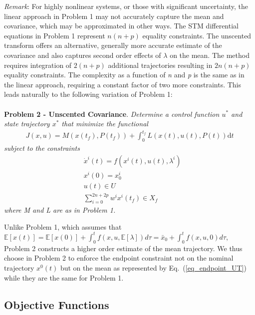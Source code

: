\documentclass[10pt,a4paper]{article}
\begin{document}
	\textit{Remark}: For highly nonlinear systems, or those with significant uncertainty, the linear approach in Problem 1 may not accurately capture the mean and covariance, which may be approximated in other ways. The STM differential equations in Problem 1 represent $n(n+p)$ equality constraints. The unscented transform \cite{UT,UKF1} offers an alternative, generally more accurate estimate of the covariance and also captures second order effects of $\lambda$ on the mean. The method requires integration of $2(n+p)$ additional trajectories resulting in $2n(n+p)$ equality constraints. The complexity as a function of \textit{n} and \textit{p} is the same as in the linear approach, requiring a constant factor of two more constraints. This leads naturally to the following variation of Problem 1:
	\\\\
	\textbf{Problem 2 - Unscented Covariance}. \textit{Determine a control function $ u^* $ and state trajectory $ x^* $ that minimize the functional}
		\begin{align}
		J(x,u) = M(x(t_f),P(t_f)) + \int_{0}^{t_f}L(x(t),u(t),P(t))\mathrm{d}t
		\end{align}
		\textit{	subject to the constraints }
		\begin{align}
		&\dot{x}^i(t) = f(x^i(t),u(t),\lambda^i) \\
		&x^i(0) = x^i_0 \\
		&u(t) \in U \\
		&\sum_{i=0}^{2n+2p}w^ix^i(t_f) \in X_f \label{eq_endpoint_UT}
		\end{align}
	\textit{where M and L are as in Problem 1.}
		
	Unlike Problem 1, which assumes that $\mathbb{E}[x(t)] = \mathbb{E}[x(0)] + \int_{0}^{t} f(x,u,\mathbb{E}[\lambda]) d\tau = \bar{x}_0 + \int_{0}^{t} f(x,u,0) d\tau$, Problem 2 constructs a higher order estimate of the mean trajectory. We thus choose in Problem 2 to enforce the endpoint constraint not on the nominal trajectory $x^0(t)$ but on the mean as represented by Eq.~(\ref{eq_endpoint_UT}) while they are the same for Problem 1.
	
	
		
	
	\subsection{Objective Functions}
	
\end{document}
